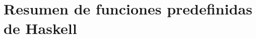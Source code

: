 

\newcommand{\verba}[1]{%
  \fbox{\textcolor{blue}{\ \texttt{#1}\phantom{I}}}}


\chapter{Resumen de funciones predefinidas de Haskell}
\label{resumen}

